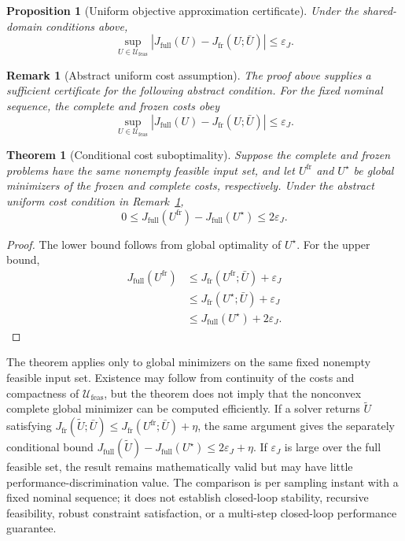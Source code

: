 \documentclass[journal]{IEEEtran}
\newtheorem{theorem}{Theorem}
\newtheorem{proposition}{Proposition}
\newtheorem{remark}{Remark}
\begin{document}
\begin{proposition}[Uniform objective approximation certificate]
\label{prop:uniform_cost_certificate}
Under the shared-domain conditions above,
\begin{equation}
 \sup_{U\in\mathcal U_{\mathrm{feas}}}
 \left|J_{\mathrm{full}}(U)-J_{\mathrm{fr}}(U;\bar U)\right|\le\varepsilon_J.
 \label{eq:uniform_cost_certificate}
\end{equation}
\end{proposition}
\begin{remark}[Abstract uniform cost assumption]
\label{ass:cost_approximation}
The proof above supplies a sufficient certificate for the following abstract condition. For the fixed nominal sequence, the complete and frozen costs obey
\begin{equation}
    \sup_{U\in\mathcal U_{\mathrm{feas}}}
    |J_{\mathrm{full}}(U)-J_{\mathrm{fr}}(U;\bar U)|\le\varepsilon_J.
\end{equation}
\end{remark}

\begin{theorem}[Conditional cost suboptimality]
\label{thm:suboptimality}
Suppose the complete and frozen problems have the same nonempty feasible input set, and let $U^{\mathrm{fr}}$ and $U^\star$ be global minimizers of the frozen and complete costs, respectively. Under the abstract uniform cost condition in Remark~\ref{ass:cost_approximation},
\begin{equation}
    0\le J_{\mathrm{full}}(U^{\mathrm{fr}})-J_{\mathrm{full}}(U^\star)
    \le2\varepsilon_J.
    \label{eq:suboptimality_bound}
\end{equation}
\end{theorem}
\begin{proof}
The lower bound follows from global optimality of $U^\star$. For the upper bound,
\begin{align*}
J_{\mathrm{full}}(U^{\mathrm{fr}})
&\le J_{\mathrm{fr}}(U^{\mathrm{fr}};\bar U)+\varepsilon_J\\
&\le J_{\mathrm{fr}}(U^\star;\bar U)+\varepsilon_J\\
&\le J_{\mathrm{full}}(U^\star)+2\varepsilon_J.
\end{align*}
\end{proof}

The theorem applies only to global minimizers on the same fixed nonempty feasible input set. Existence may follow from continuity of the costs and compactness of $\mathcal U_{\mathrm{feas}}$, but the theorem does not imply that the nonconvex complete global minimizer can be computed efficiently. If a solver returns $\widetilde U$ satisfying $J_{\mathrm{fr}}(\widetilde U;\bar U)\le J_{\mathrm{fr}}(U^{\mathrm{fr}};\bar U)+\eta$, the same argument gives the separately conditional bound $J_{\mathrm{full}}(\widetilde U)-J_{\mathrm{full}}(U^\star)\le2\varepsilon_J+\eta$. If $\varepsilon_J$ is large over the full feasible set, the result remains mathematically valid but may have little performance-discrimination value. The comparison is per sampling instant with a fixed nominal sequence; it does not establish closed-loop stability, recursive feasibility, robust constraint satisfaction, or a multi-step closed-loop performance guarantee.
\end{document}
